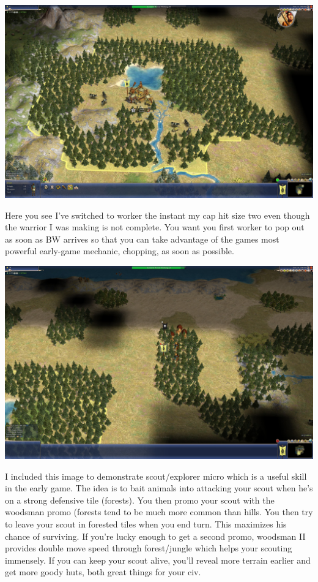 \documentclass[10pt]{article}
\begin{document}
\includegraphics[width=1.0\textwidth]{4}

Here you see I've switched to worker the instant my cap hit size two even though the warrior
I was making is not complete. You want you first worker to pop out as soon as BW arrives so
that you can take advantage of the games most powerful early-game mechanic, chopping, as soon
as possible.

\includegraphics[width=1.0\textwidth]{5}

I included this image to demonstrate scout/explorer micro which is a useful skill in the early
game. The idea is to bait animals into attacking your scout when he's on a strong defensive
tile (forests). You then promo your scout with the woodsman promo (forests tend to be
much more common than hills. You then try to leave your scout in forested tiles when you end turn.
This maximizes his chance of surviving. If you're lucky enough to get a second promo, woodsman II
provides double move speed through forest/jungle which helps your scouting immensely. If you can keep
your scout alive, you'll reveal more terrain earlier and get more goody huts, both great things for your civ.
\end{document}
